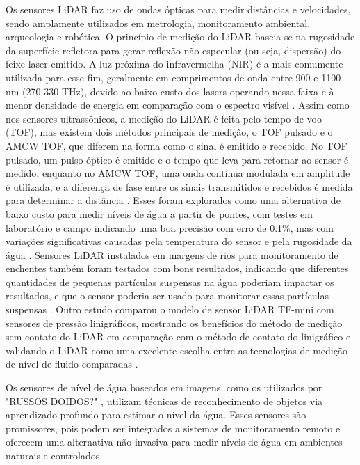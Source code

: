 Os sensores LiDAR faz uso de ondas ópticas para medir distâncias e velocidades, sendo amplamente utilizados em metrologia, monitoramento ambiental, arqueologia e robótica. O princípio de medição do LiDAR baseia-se na rugosidade da superfície refletora para gerar reflexão não especular (ou seja, dispersão) do feixe laser emitido.  A luz próxima do infravermelha  (NIR) é a mais comumente utilizada para esse fim, geralmente em comprimentos de onda entre 900 e 1100 nm (270-330 THz), devido ao baixo custo dos lasers operando nessa faixa e à menor densidade de energia em comparação com o espectro visível \cite{li_2022_a, fernandezdiaz_2014_early, smart_2009_river, behroozpour_2017_lidar}. Assim como nos sensores ultrassônicos, a medição do LiDAR é feita pelo tempo de voo (TOF), mas existem dois métodos principais de medição, o TOF pulsado e o AMCW TOF, que diferem na forma como o sinal é emitido e recebido. No TOF pulsado, um pulso óptico é emitido e o tempo que leva para retornar ao sensor é medido, enquanto no AMCW TOF, uma onda contínua modulada em amplitude é utilizada, e a diferença de fase entre os sinais transmitidos e recebidos é medida para determinar a distância \cite{li_2022_a}.
Esses foram explorados como uma alternativa de baixo custo para medir níveis de água a partir de pontes, com testes em laboratório e campo indicando uma boa precisão com erro de 0.1\%, mas com variações significativas causadas pela temperatura do sensor e pela rugosidade da água \cite{paul_2020_a}. Sensores LiDAR instalados em margens de rios para monitoramento de enchentes também foram testados com bons resultados, indicando que diferentes quantidades de pequenas partículas suspensas na água poderiam impactar os resultados, e que o sensor poderia ser usado para monitorar essas partículas suspensas \cite{tamari_2016_flash}. Outro estudo comparou o modelo de sensor LiDAR TF-mini com sensores de pressão linigráficos, mostrando os benefícios do método de medição sem contato do LiDAR em comparação com o método de contato do linigráfico e validando o LiDAR como uma excelente escolha entre as tecnologias de medição de nível de fluido comparadas \cite{santana_2024_development}.


Os sensores de nível de água baseados em imagens, como os utilizados por "RUSSOS DOIDOS?" \textcite{santana_2024_development}, utilizam técnicas de reconhecimento de objetos via aprendizado profundo para estimar o nível da água. Esses sensores são promissores, pois podem ser integrados a sistemas de monitoramento remoto e oferecem uma alternativa não invasiva para medir níveis de água em ambientes naturais e controlados.


